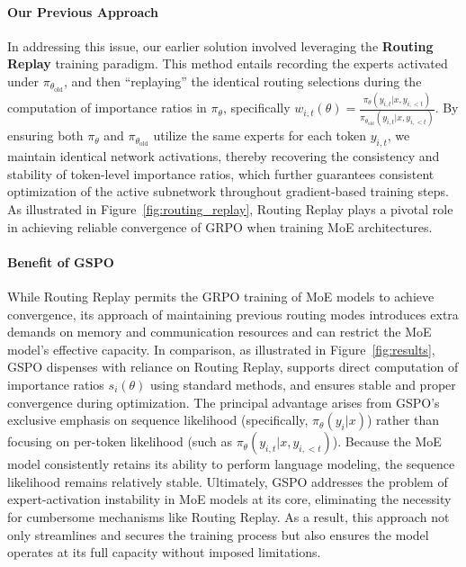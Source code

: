 \paragraph{Our Previous Approach} In addressing this issue, our earlier solution involved leveraging the \textbf{Routing Replay} training paradigm. This method entails recording the experts activated under $\pi_{\theta_\text{old}}$, and then ``replaying'' the identical routing selections during the computation of importance ratios in $\pi_{\theta}$, specifically $w_{i,t}(\theta) = \frac{ \pi_{\theta} (y_{i,t} | x, y_{i,<t}) }{ \pi_{\theta_\text{old}} (y_{i,t} | x,y_{i,<t})}$. By ensuring both $\pi_{\theta}$ and $\pi_{\theta_\text{old}}$ utilize the same experts for each token $y_{i,t}$, we maintain identical network activations, thereby recovering the consistency and stability of token-level importance ratios, which further guarantees consistent optimization of the active subnetwork throughout gradient-based training steps. As illustrated in Figure~\ref{fig:routing_replay}, Routing Replay plays a pivotal role in achieving reliable convergence of GRPO when training MoE architectures.

\paragraph{Benefit of GSPO} While Routing Replay permits the GRPO training of MoE models to achieve convergence, its approach of maintaining previous routing modes introduces extra demands on memory and communication resources and can restrict the MoE model's effective capacity. In comparison, as illustrated in Figure~\ref{fig:results}, GSPO dispenses with reliance on Routing Replay, supports direct computation of importance ratios $s_i(\theta)$ using standard methods, and ensures stable and proper convergence during optimization. The principal advantage arises from GSPO’s exclusive emphasis on sequence likelihood (specifically, $\pi_{\theta} (y_i | x)$) rather than focusing on per-token likelihood (such as $\pi_{\theta} (y_{i,t} | x, y_{i,<t})$). Because the MoE model consistently retains its ability to perform language modeling, the sequence likelihood remains relatively stable. Ultimately, GSPO addresses the problem of expert-activation instability in MoE models at its core, eliminating the necessity for cumbersome mechanisms like Routing Replay. As a result, this approach not only streamlines and secures the training process but also ensures the model operates at its full capacity without imposed limitations.

